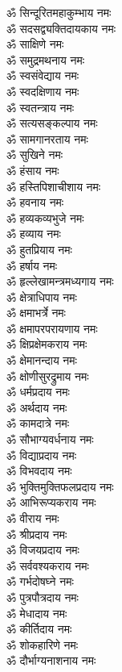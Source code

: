 \begin{multicols}{2}
\begin{flushleft}
ॐ सिन्दूरितमहाकुम्भाय नमः\\
ॐ सदसद्व्यक्तिदायकाय नमः\\
ॐ साक्षिणे नमः\\
ॐ समुद्रमथनाय नमः\\
ॐ स्वसंवेद्याय नमः\\
ॐ स्वदक्षिणाय नमः\\
ॐ स्वतन्त्राय नमः\\
ॐ सत्यसङ्कल्पाय नमः\\
ॐ सामगानरताय नमः\\
ॐ सुखिने नमः\hfill{}\\
ॐ हंसाय नमः\\
ॐ हस्तिपिशाचीशाय नमः\\
ॐ हवनाय नमः\\
ॐ हव्यकव्यभुजे नमः\\
ॐ हव्याय नमः\\
ॐ हुतप्रियाय नमः\\
ॐ हर्षाय नमः\\
ॐ हृल्लेखामन्त्रमध्यगाय नमः\\
ॐ क्षेत्राधिपाय नमः\\
ॐ क्षमाभर्त्रे नमः\hfill{}\\
ॐ क्षमापरपरायणाय नमः\\
ॐ क्षिप्रक्षेमकराय नमः\\
ॐ क्षेमानन्दाय नमः\\
ॐ क्षोणीसुरद्रुमाय नमः\\
ॐ धर्मप्रदाय नमः\\
ॐ अर्थदाय नमः\\
ॐ कामदात्रे नमः\\
ॐ सौभाग्यवर्धनाय नमः\\
ॐ विद्याप्रदाय नमः\\
ॐ विभवदाय नमः\hfill{}\\
ॐ भुक्तिमुक्तिफलप्रदाय नमः\\
ॐ आभिरूप्यकराय नमः\\
ॐ वीराय नमः\\
ॐ श्रीप्रदाय नमः\\
ॐ विजयप्रदाय नमः\\
ॐ सर्ववश्यकराय नमः\\
ॐ गर्भदोषघ्ने नमः\\
ॐ पुत्रपौत्रदाय नमः\\
ॐ मेधादाय नमः\\
ॐ कीर्तिदाय नमः\hfill{}\\
ॐ शोकहारिणे नमः\\
ॐ दौर्भाग्यनाशनाय नमः\\

\end{flushleft}
\end{multicols}
